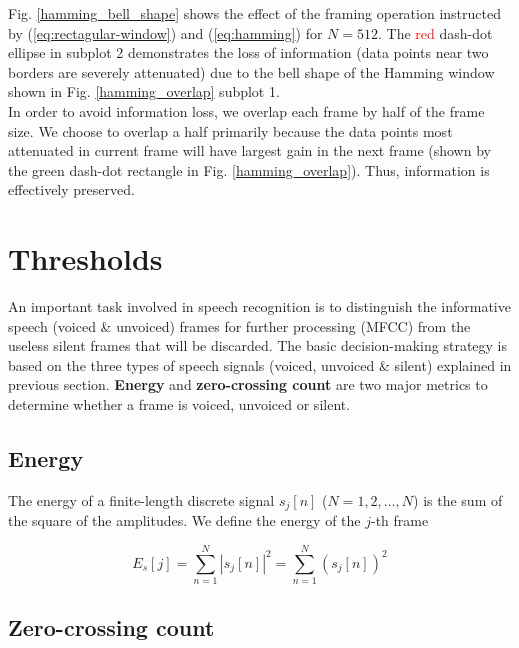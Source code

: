 Fig. \ref{hamming_bell_shape} shows the effect of the framing operation instructed by (\ref{eq:rectagular-window}) and (\ref{eq:hamming}) for $N = 512$. The \textcolor{red}{red} dash-dot ellipse in subplot 2 demonstrates the loss of information (data points near two borders are severely attenuated) due to the bell shape of the Hamming window shown in Fig. \ref{hamming_overlap} subplot 1.\\

In order to avoid information loss, we overlap each frame by half of the frame size. We choose to overlap a half primarily because the data points most attenuated in current frame will have largest gain in the next frame (shown by the \textcolor{green_html}{green} dash-dot rectangle in Fig. \ref{hamming_overlap}). Thus, information is effectively preserved.


\section{Thresholds}

An important task involved in speech recognition is to distinguish the informative speech (voiced \& unvoiced) frames for further processing (MFCC) from the useless silent frames that will be discarded. The basic decision-making strategy is based on the three types of speech signals (voiced, unvoiced \& silent) explained in previous section. \textbf{Energy} and \textbf{zero-crossing count} are two major metrics to determine whether a frame is voiced, unvoiced or silent.


\subsection{Energy}

The energy of a finite-length discrete signal $s_j[n]$ ($N = 1, 2, \dots, N$) is the sum of the square of the amplitudes. We define the energy of the $j$-th frame

\begin{equation}
\label{eq:frame-energy}
E_s[j] = \sum_{n=1}^{N} |s_j[n]|^2 = \sum_{n=1}^{N} (s_j[n])^2
\end{equation}


\subsection{Zero-crossing count}

